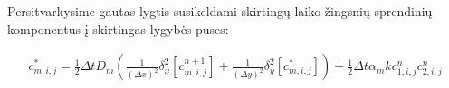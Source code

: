 Persitvarkysime gautas lygtis susikeldami skirtingų laiko žingsnių sprendinių komponentus į skirtingas lygybės puses:



\begin{align}
    c^*_{m,i,j} = \frac{1}{2}\Delta tD_m\left(\frac{1}{(\Delta x)^2}\delta_x^2[c^{n+1}_{m,i,j}] + \frac{1}{(\Delta y)^2}\delta_y^2[c^*_{m,i,j}]\right)+ \frac{1}{2}\Delta t\alpha_m kc^n_{1,i,j}c^n_{2,i,j}
\end{align}

